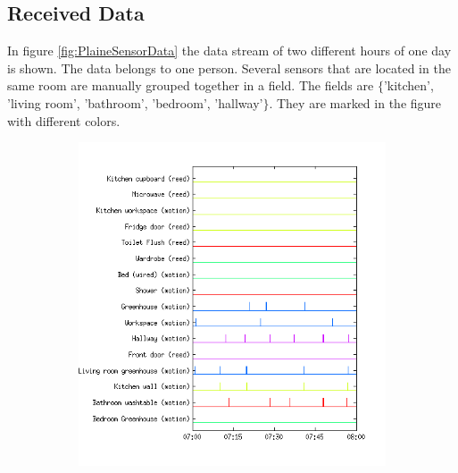 \documentclass[11pt,a4paper]{article}
\begin{document}
\subsection{Received Data}
In figure \ref{fig:PlaineSensorData} the data stream of two different hours of one day is shown. The data belongs to one person. Several sensors that are located in the same room are manually grouped together in a field. The fields are $\{$'kitchen', 'living room', 'bathroom', 'bedroom', 'hallway'$\}$. They are marked in the figure with different colors.

\begin{figure}[h!]
  \centering
  \begin{subfigure}[b]{0.45\textwidth}
    \centering
    \includegraphics[width=\textwidth]{Pictures/SensorsMorningHN3Day34.png}
  \end{subfigure}
  ~
  \begin{subfigure}[b]{0.45\textwidth}
    \centering

\end{subfigure}
\end{figure}
\end{document}

